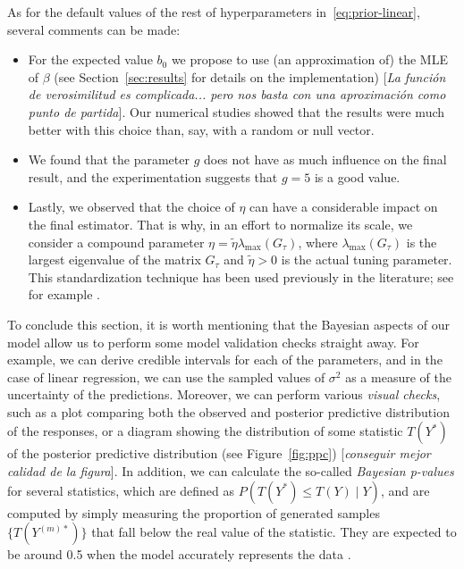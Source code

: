 \documentclass[ba]{imsart}
\numberwithin{equation}{section}
\theoremstyle{plain}
\newcommand\incomment[1]{\color{red}[\textit{#1}]\color{black}}
\begin{document}
As for the default values of the rest of hyperparameters in~\eqref{eq:prior-linear}, several comments can be made:
\begin{itemize}
  \item For the expected value \(b_0\) we propose to use (an approximation of) the MLE of \(\beta\) (see Section~\ref{sec:results} for details on the implementation) \incomment{La función de verosimilitud es complicada... pero nos basta con una aproximación como punto de partida}. Our numerical studies showed that the results were much better with this choice than, say, with a random or null vector.
  \item We found that the parameter \(g\) does not have as much influence on the final result, and the experimentation suggests that \(g=5\) is a good value.
  \item Lastly, we observed that the choice of \(\eta\) can have a considerable impact on the final estimator. That is why, in an effort to normalize its scale, we consider a compound parameter \(\eta = \tilde \eta \lambda_{\max}(G_\tau)\), where \(\lambda_{\max}(G_\tau)\) is the largest eigenvalue of the matrix \(G_\tau\) and \(\tilde\eta > 0\) is the actual tuning parameter. This standardization technique has been used previously in the literature; see for example \citet{grollemund2019bayesian}.
\end{itemize}

To conclude this section, it is worth mentioning that the Bayesian aspects of our model allow us to perform some model validation checks straight away. For example, we can derive credible intervals for each of the parameters, and in the case of linear regression, we can use the sampled values of \(\sigma^2\) as a measure of the uncertainty of the predictions. Moreover, we can perform various \textit{visual checks}, such as a plot comparing both the observed and posterior predictive distribution of the responses, or a diagram showing the distribution of some statistic \(T(Y^*)\) of the posterior predictive distribution (see Figure~\ref{fig:ppc}) \incomment{conseguir mejor calidad de la figura}. In addition, we can calculate the so-called \textit{Bayesian p-values} for several statistics, which are defined as \(P(T(Y^*)\leq T(Y)\mid Y)\), and are computed by simply measuring the proportion of generated samples \(\{T(Y^{(m)*})\}\) that fall below the real value of the statistic. They are expected to be around 0.5 when the model accurately represents the data \citep[see][Ch.~6]{gelman1995bayesian}.
\end{document}
